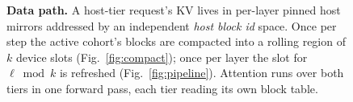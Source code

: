 \begin{figure}[t]
\caption{\textbf{Data path.} A host-tier request's KV lives in per-layer pinned
host mirrors addressed by an independent \emph{host block id} space. Once per
step the active cohort's blocks are compacted into a rolling region of $k$
device slots (Fig.~\ref{fig:compact}); once per layer the slot for
$\ell \bmod k$ is refreshed (Fig.~\ref{fig:pipeline}). Attention runs over both
tiers in one forward pass, each tier reading its own block table.}
\label{fig:arch}
\end{figure}
